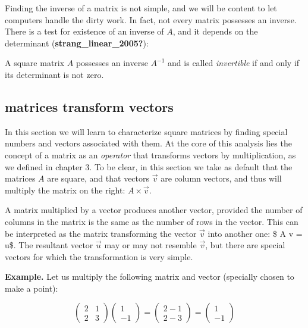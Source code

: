 \documentclass[
  letterpaper,
  DIV=11,
  numbers=noendperiod]{scrreprt}
\begin{document}
Finding the inverse of a matrix is not simple, and we will be content to
let computers handle the dirty work. In fact, not every matrix possesses
an inverse. There is a test for existence of an inverse of \(A\), and it
depends on the determinant (\textbf{strang\_linear\_2005?}):

A square matrix \(A\) possesses an inverse \(A^{-1}\) and is called
\emph{invertible} if and only if its determinant is not zero.

\hypertarget{matrices-transform-vectors}{%
\subsection{matrices transform
vectors}\label{matrices-transform-vectors}}

In this section we will learn to characterize square matrices by finding
special numbers and vectors associated with them. At the core of this
analysis lies the concept of a matrix as an \emph{operator} that
transforms vectors by multiplication, as we defined in chapter 3. To be
clear, in this section we take as default that the matrices \(A\) are
square, and that vectors \(\vec v\) are column vectors, and thus will
multiply the matrix on the right: \(A \times \vec v\).

A matrix multiplied by a vector produces another vector, provided the
number of columns in the matrix is the same as the number of rows in the
vector. This can be interpreted as the matrix transforming the vector
\(\vec v\) into another one: \$ A \times  \vec v = \vec u\$. The
resultant vector \(\vec u\) may or may not resemble \(\vec v\), but
there are special vectors for which the transformation is very simple.

\textbf{Example.} Let us multiply the following matrix and vector
(specially chosen to make a point):

\[
\left(\begin{array}{cc}2 & 1 \\ 2& 3\end{array}\right)\left(\begin{array}{c}1 \\ -1 \end{array}\right) = \left(\begin{array}{c}2 -1 \\ 2 - 3 \end{array}\right) =  \left(\begin{array}{c} 1 \\ -1 \end{array}\right)
\]
\end{document}
